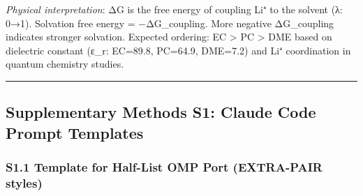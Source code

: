 \documentclass[
  11pt,
]{article}
\begin{document}
\emph{Physical interpretation}: ΔG is the free energy of coupling Li⁺ to
the solvent (λ: 0→1). Solvation free energy = −ΔG\_coupling. More
negative ΔG\_coupling indicates stronger solvation. Expected ordering:
EC \textgreater{} PC \textgreater{} DME based on dielectric constant
(ε\_r: EC=89.8, PC=64.9, DME=7.2) and Li⁺ coordination in quantum
chemistry studies.

\begin{center}\rule{0.5\linewidth}{0.5pt}\end{center}

\subsection{Supplementary Methods S1: Claude Code Prompt
Templates}\label{supplementary-methods-s1-claude-code-prompt-templates}

\subsubsection{S1.1 Template for Half-List OMP Port (EXTRA-PAIR
styles)}\label{s1.1-template-for-half-list-omp-port-extra-pair-styles}
\end{document}

